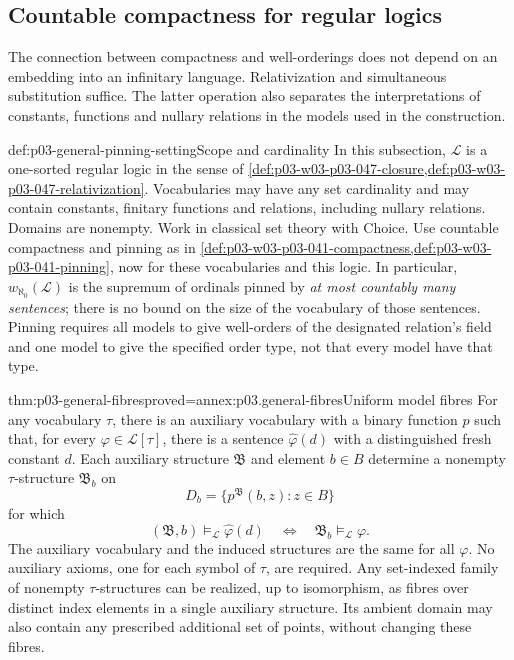 \subsection{Countable compactness for regular logics}
\label{sec:p03-general-pinning}

The connection between compactness and well-orderings does not depend on
an embedding into an infinitary language. Relativization and simultaneous
substitution suffice. The latter operation also separates the
interpretations of constants, functions and nullary relations in the
models used in the construction.

\begin{hbconvention}{def:p03-general-pinning-setting}{Scope and cardinality}
In this subsection, \(\mathscr L\) is a one-sorted regular logic in the
sense of \cref{def:p03-w03-p03-047-closure,def:p03-w03-p03-047-relativization}.
Vocabularies may have any set cardinality and may contain constants,
finitary functions and relations, including nullary relations.
Domains are nonempty. Work in classical set theory with Choice.
Use countable compactness and pinning as in
\cref{def:p03-w03-p03-041-compactness,def:p03-w03-p03-041-pinning},
now for these vocabularies and this logic. In particular,
\(w_{\aleph_0}(\mathscr L)\) is the supremum of ordinals pinned by
\emph{at most countably many sentences}; there is no bound on the
size of the vocabulary of those sentences. Pinning requires all models
to give well-orders of the designated relation's field and one model
to give the specified order type, not that every model have that type.
\end{hbconvention}

\begin{hbtheorem}{thm:p03-general-fibres}{proved=annex:p03.general-fibres}{Uniform model fibres}
For any vocabulary \(\tau\), there is an auxiliary vocabulary with a
binary function \(p\) such that, for every \(\varphi\in\mathscr L[\tau]\),
there is a sentence \(\widehat\varphi(d)\) with a distinguished fresh
constant \(d\). Each auxiliary structure \(\mathfrak B\) and element
\(b\in B\) determine a nonempty \(\tau\)-structure \(\mathfrak B_b\)
on
\[
 D_b=\{p^{\mathfrak B}(b,z):z\in B\}
\]
for which
\[
 (\mathfrak B,b)\models_{\mathscr L}\widehat\varphi(d)
 \quad\Longleftrightarrow\quad
 \mathfrak B_b\models_{\mathscr L}\varphi.
\]
The auxiliary vocabulary and the induced structures are the same for
all \(\varphi\). No auxiliary axioms, one for each symbol of \(\tau\),
are required. Any set-indexed family of nonempty \(\tau\)-structures can
be realized, up to isomorphism, as fibres over distinct index elements
in a single auxiliary structure. Its ambient domain may also contain
any prescribed additional set of points, without changing these fibres.
\end{hbtheorem}

